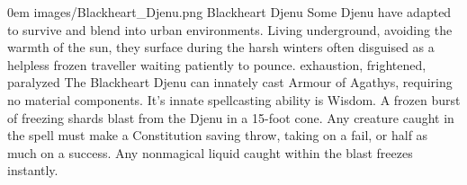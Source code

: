 \documentclass[letterpaper,openany,oneside,twocolumn]{book}
\begin{document}
\MonsterVariant%
	{0em}%
	{images/Blackheart_Djenu.png}%
	{Blackheart Djenu}%
	{%
		Some Djenu have adapted to survive and blend into urban environments. Living underground, avoiding the warmth of the sun, they surface during the harsh winters often disguised as a helpless frozen traveller waiting patiently to pounce.
		exhaustion, frightened, paralyzed
		The Blackheart Djenu can innately cast Armour of Agathys, requiring  no material components. It's innate spellcasting ability is Wisdom.
		A frozen burst of freezing shards blast from the Djenu in a 15-foot cone. Any creature caught in the spell must make a Constitution saving throw, taking  on a fail, or half as much on a success. Any nonmagical liquid caught within the blast freezes instantly.
	}%
\end{document}
